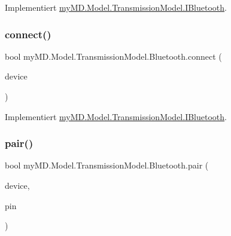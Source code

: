 Implementiert \mbox{\hyperlink{interfacemy_m_d_1_1_model_1_1_transmission_model_1_1_i_bluetooth_ad17c0199f5a72b2964b5b38b565ad6fc}{my\+M\+D.\+Model.\+Transmission\+Model.\+I\+Bluetooth}}.

\mbox{\label{classmy_m_d_1_1_model_1_1_transmission_model_1_1_bluetooth_add794d082480db984a9d49630d1e5bba}} 
\subsubsection{\texorpdfstring{connect()}{connect()}}
{\footnotesize\ttfamily bool my\+M\+D.\+Model.\+Transmission\+Model.\+Bluetooth.\+connect (\begin{DoxyParamCaption}\item[{\mbox{\hyperlink{interfacemy_m_d_1_1_model_interface_1_1_transmission_model_interface_1_1_i_device}{I\+Device}}}]{device }\end{DoxyParamCaption})}



Implementiert \mbox{\hyperlink{interfacemy_m_d_1_1_model_1_1_transmission_model_1_1_i_bluetooth_a02d846b9c9b31d1ea1d35780928c3ba4}{my\+M\+D.\+Model.\+Transmission\+Model.\+I\+Bluetooth}}.

\mbox{\label{classmy_m_d_1_1_model_1_1_transmission_model_1_1_bluetooth_a4955c9878fb425d4c20f344ecd16c2d1}} 
\subsubsection{\texorpdfstring{pair()}{pair()}}
{\footnotesize\ttfamily bool my\+M\+D.\+Model.\+Transmission\+Model.\+Bluetooth.\+pair (\begin{DoxyParamCaption}\item[{\mbox{\hyperlink{interfacemy_m_d_1_1_model_interface_1_1_transmission_model_interface_1_1_i_device}{I\+Device}}}]{device,  }\item[{string}]{pin }\end{DoxyParamCaption})}



